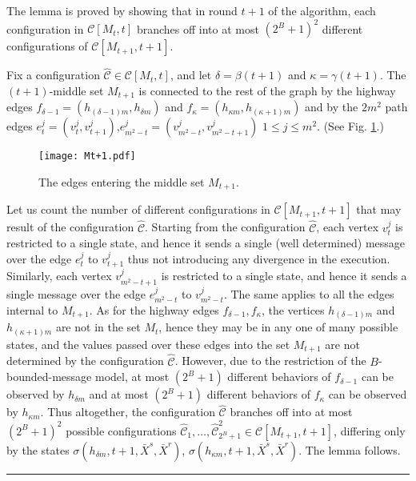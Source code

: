 \documentclass[11pt,letter]{article}
\def\cC{\mathcal{C}}
\def\hC{\hat{\mathcal{C}}}
\def\INPUT{\bar{X}^s,\bar{X}^r}
\newcommand{\qed}{\rule{7pt}{7pt}}
\newenvironment{proof}{\noindent{\bf Proof}\hspace*{1em}}{\qed\bigskip}
\begin{document}
\begin{proof}
The lemma is proved by showing that in round $t+1$ of the algorithm,
each configuration in $\cC[M_t,t]$ branches off into at most $(2^B+1)^2$
different configurations of $\cC[M_{t+1},t+1]$.

Fix a configuration $\hC \in \cC[M_t,t]$, and let $\delta=\beta(t+1)$ and 
$\kappa=\gamma(t+1)$.
The $(t+1)$-middle set $M_{t+1}$ is connected to the rest of the graph by the
highway edges $f_{\delta-1} = (h_{(\delta-1)m}, h_{\delta m})$ and 
$f_{\kappa} = (h_{\kappa m}, h_{(\kappa+1) m})$
and by the $2m^2$ path edges 
$e^j_t = (v_t^j,v_{t+1}^j)$,$e^j_{m^2-t} = (v_{m^2-t}^j,v_{m^2-t+1}^j)$
$1\le j\le m^2$. (See Fig. \ref{f:Tt+1}.)
\begin{figure} [htb]
\begin{center}

\centerline{\texttt{[image: Mt+1.pdf]}}

\caption[]{
\label{f:Tt+1}
\sf
The edges entering the middle set $M_{t+1}$. }
\end{center}
\end{figure}

Let us count the number of different configurations in
$\cC[M_{t+1},t+1]$
that may result of the configuration $\hC$.
Starting from the configuration $\hC$, each vertex $v_t^j$ is
restricted
to a single state, and hence it sends a single (well determined)
message over the edge $e^j_t$ to $v_{t+1}^j$
thus not introducing any divergence in the execution. Similarly, each vertex 
$v_{m^2-t+1}^j$  is restricted to a single state, and hence it sends a single
message over the edge $e^j_{m^2-t}$ to $v_{m^2-t}^j$.
The same applies to all the edges internal to $M_{t+1}$.
As for the highway edges $f_{\delta-1}, f_{\kappa}$, the vertices 
$h_{(\delta-1)m}$  and $h_{(\kappa+1)m}$ are not in the set $M_t$, 
hence they may be in any one of many possible states, 
and the values passed over these edges into the set $M_{t+1}$
are not determined by the configuration $\hC$. However, due to the
restriction of the $B$-bounded-message model, at most $(2^B+1)$
different behaviors of $f_{\delta-1}$ can be observed by $h_{\delta m}$ 
and at most $(2^B+1)$ different behaviors of $f_{\kappa}$ can be observed 
by $h_{\kappa m}$.
Thus altogether, the configuration $\hC$ branches off into at most
$(2^B+1)^2$ possible configurations 
$\hC_1,\dots,\hC_{2^B+1}^2 \in \cC[M_{t+1},t+1]$, 
differing only by the states $\sigma(h_{\delta m}, t+1, \INPUT)$, 
$\sigma(h_{\kappa m}, t+1, \INPUT)$.
The lemma follows.
\end{proof}
\end{document}
